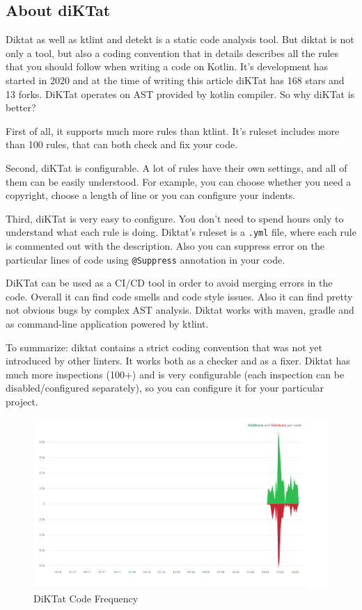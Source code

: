 \subsection{About diKTat}
Diktat as well as ktlint and detekt is a static code analysis tool. But diktat is not only a tool, but also a coding convention that in details describes all the rules that you should follow when writing a code on Kotlin. It’s development has started in 2020 and at the time of writing this article diKTat has 168 stars and 13 forks. DiKTat operates on AST provided by kotlin compiler. So why diKTat is better?

First of all, it supports much more rules than ktlint. It’s ruleset includes more than 100 rules, that can both check and fix your code.

Second, diKTat is configurable. A lot of rules have their own settings, and all of them can be easily understood. For example, you can choose whether you need a copyright, choose a length of line or you can configure your indents.

Third, diKTat is very easy to configure. You don’t need to spend hours only to understand what each rule is doing. Diktat’s ruleset is a \texttt{.yml} file, where each rule is commented out with the description. Also you can suppress error on the particular lines of code using \texttt{@Suppress} annotation in your code.

DiKTat can be used as a CI/CD tool in order to avoid merging errors in the code. Overall it can find code smells and code style issues. Also it can find pretty not obvious bugs by complex AST analysis. Diktat works with maven, gradle and as command-line application powered by ktlint.

To summarize: diktat contains a strict coding convention that was not yet introduced by other linters. It works both as a checker and as a fixer. Diktat has much more inspections (100+) and is very configurable (each inspection can be disabled/configured separately), so you can configure it for your particular project.

\begin{figure}[H]
    \centering
    \includegraphics[scale = 0.3]{pictures/diktat.png}
    \caption{DiKTat Code Frequency}
    \label{fig:png_diktat}
\end{figure}

